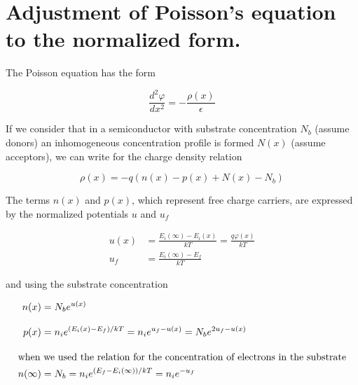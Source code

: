 
\chapter{Adjustment of Poisson's equation to the normalized form.}\label{app:AppendixB}

The Poisson equation has the form

\begin{equation}\label{eq:B.1}
  \frac{d^{2}\varphi}{dx^2} = - \frac{\rho(x)}{\epsilon}
\end{equation}

If we consider that in a semiconductor with substrate concentration
$N_b$ (assume donors) an inhomogeneous concentration profile is formed
$N(x)$ (assume acceptors), we can write for the charge density
relation

\begin{equation}\label{eq:B.2}
  \rho(x) = - q (n(x) - p(x) + N(x) -N_b)
\end{equation}

The terms $n(x)$ and $p(x)$, which represent free charge carriers, are
expressed by the normalized potentials $u$ and $u_f$

\begin{subequations}\label{eq:B.3}
  \begin{align}
    u(x) &= \frac{E_i(\infty) - E_i(x)}{kT} = \frac{q\varphi(x)}{kT} \label{eq:B.3a}\\[0.3cm]
    u_f &= \frac{E_i(\infty) - E_f}{kT} \label{eq:B.3b}
  \end{align}
\end{subequations}

and using the substrate concentration

\begin{subequations}\label{eq:B.4}
  \begin{align}
    n(x) &= N_b {e}^{u(x)}\label{eq:B.4a}\\[0.3cm]
    p(x) &= n_i {e}^{({E_i(x) - E_f})/{kT}} = n_i {e}^{u_f-u(x)} = N_b {e}^{2u_f-u(x)}\label{eq:B.4b}\\[0.3cm]
    \intertext{when we used the relation for the concentration of electrons in the substrate}
    n(\infty) &= N_b = n_i {e}^{({E_f-E_i(\infty)})/{kT}} = n_i {e}^{-u_f}\label{eq:B.4c}
  \end{align}
\end{subequations}

